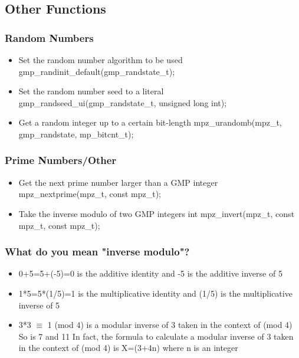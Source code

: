 
\subsection{Other Functions}

\begin{frame}
\frametitle{Random Numbers}
  \begin{itemize}
    \item Set the random number algorithm to be used\break
    gmp\_randinit\_default(gmp\_randstate\_t);
    \item Set the random number seed to a literal\break
    gmp\_randseed\_ui(gmp\_randstate\_t, unsigned long int);
    \item Get a random integer up to a certain bit-length\break
    mpz\_urandomb(mpz\_t, gmp\_randstate, mp\_bitcnt\_t);
  \end{itemize}
\end{frame}

\begin{frame}
\frametitle{Prime Numbers/Other}
  \begin{itemize}
    \item Get the next prime number larger than a GMP integer\break
    mpz\_nextprime(mpz\_t, const mpz\_t);
    \item Take the inverse modulo of two GMP integers\break
    int mpz\_invert(mpz\_t, const mpz\_t, const mpz\_t);
  \end{itemize}
\end{frame}

\begin{frame}
\frametitle{What do you mean "inverse modulo"?}
  \begin{itemize}
    \item 0+5=5+(-5)=0 is the additive identity and -5 is the additive inverse of 5
    \item 1*5=5*(1/5)=1 is the multiplicative identity and (1/5) is the multiplicative inverse of 5
    \item 3*3 $\equiv$ 1 (mod 4) is a modular inverse of 3 taken in the context of (mod 4)\break
    So is 7 and 11\break
    In fact, the formula to calculate a modular inverse of 3 taken
    in the context of (mod 4) is X=(3+4n) where n is an integer
  \end{itemize}
\end{frame}
